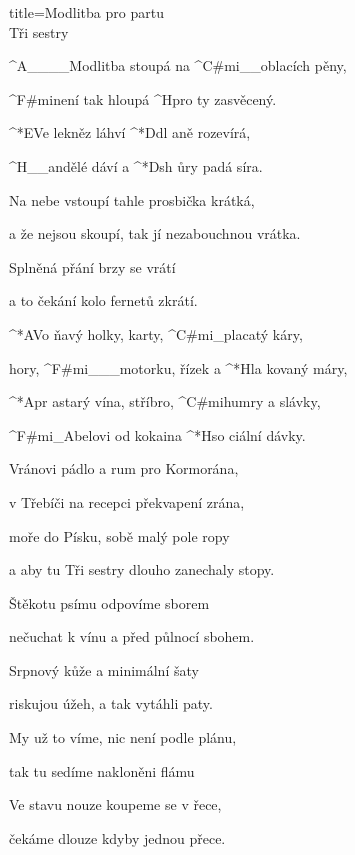 \begin{song}{title=\predtitle\centering Modlitba pro partu \\\large Tři sestry \vspace*{-0.3cm}}  %
\begin{centerjustified}

\sloka 
	^{A{\color{white}\_\_\_\_}}Modlitba stoupá na ^{C#mi{\color{white}\_\_}}oblacích pěny,

	^{F#mi}není tak hloupá ^{H}pro ty zasvěcený.
	
	^*{E}Ve lekněz láhví ^*{D}dl aně rozevírá,

	^{H{\color{white}\_\_}}andělé dáví a ^*{D}sh ůry padá síra.

\sloka
	Na nebe vstoupí tahle prosbička krátká,
   
   	a že nejsou skoupí, tak jí nezabouchnou vrátka.
   
   	Splněná přání brzy se vrátí
   	
   	a to čekání kolo fernetů zkrátí.

	^*{A}Vo ňavý holky, karty, ^{C#mi{\color{white}\_}}placatý káry,
	
	hory, ^{F#mi{\color{white}\_\_\_}}motorku, řízek a ^*{H}la kovaný máry,

	^*{A}pr astarý vína, stříbro, ^{C#mi}humry a slávky,

	^{F#mi{\color{white}\_}}Abelovi od kokaina ^*{H}so ciální dávky.
	
	\phantom{.}
	
	Vránovi pádlo a rum pro Kormorána,
   	
   	v Třebíči na recepci překvapení zrána,
   
   	moře do Písku, sobě malý pole ropy
   
   	a aby tu Tři sestry dlouho zanechaly stopy.

\sloka
	Štěkotu psímu odpovíme sborem
   	
   	nečuchat k vínu a před půlnocí sbohem.
   	
   	Srpnový kůže a minimální šaty
   	
   	riskujou úžeh, a tak vytáhli paty.

\sloka
	My už to víme, nic není podle plánu,
   
   	tak tu sedíme nakloněni flámu
   	
   	Ve stavu nouze koupeme se v řece,
   
   	čekáme dlouze kdyby jednou přece.
   	


\end{centerjustified}
\setcounter{Slokočet}{0}
\end{song}
